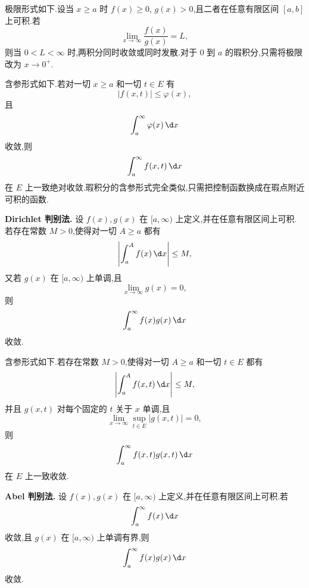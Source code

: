 极限形式如下.设当 $x\geq a$ 时 $f(x)\geq0$, $g(x)>0$,且二者在任意有限区间 $[a,b]$ 上可积.若
\begin{equation*}
	\lim_{x\to\infty}\frac{f(x)}{g(x)}=L,
\end{equation*}
则当 $0<L<\infty$ 时,两积分同时收敛或同时发散.对于 $0$ 到 $a$ 的瑕积分,只需将极限改为 $x\to0^+$.

含参形式如下.若对一切 $x\geq a$ 和一切 $t\in E$ 有
\begin{equation*}
	|f(x,t)|\leq \varphi(x),
\end{equation*}
且
\begin{equation*}
	\int_a^\infty \varphi(x)\,\d x
\end{equation*}
收敛,则
\begin{equation*}
	\int_a^\infty f(x,t)\,\d x
\end{equation*}
在 $E$ 上一致绝对收敛.瑕积分的含参形式完全类似,只需把控制函数换成在瑕点附近可积的函数.

\textbf{Dirichlet 判别法.}
设 $f(x),g(x)$ 在 $[a,\infty)$ 上定义,并在任意有限区间上可积.若存在常数 $M>0$,使得对一切 $A\geq a$ 都有
\begin{equation*}
	\left|\int_a^A f(x)\,\d x\right|\leq M,
\end{equation*}
又若 $g(x)$ 在 $[a,\infty)$ 上单调,且
\begin{equation*}
	\lim_{x\to\infty}g(x)=0,
\end{equation*}
则
\begin{equation*}
	\int_a^\infty f(x)g(x)\,\d x
\end{equation*}
收敛.

含参形式如下.若存在常数 $M>0$,使得对一切 $A\geq a$ 和一切 $t\in E$ 都有
\begin{equation*}
	\left|\int_a^A f(x,t)\,\d x\right|\leq M,
\end{equation*}
并且 $g(x,t)$ 对每个固定的 $t$ 关于 $x$ 单调,且
\begin{equation*}
	\lim_{x\to\infty}\sup_{t\in E}|g(x,t)|=0,
\end{equation*}
则
\begin{equation*}
	\int_a^\infty f(x,t)g(x,t)\,\d x
\end{equation*}
在 $E$ 上一致收敛.

\textbf{Abel 判别法.}
设 $f(x),g(x)$ 在 $[a,\infty)$ 上定义,并在任意有限区间上可积.若
\begin{equation*}
	\int_a^\infty f(x)\,\d x
\end{equation*}
收敛,且 $g(x)$ 在 $[a,\infty)$ 上单调有界,则
\begin{equation*}
	\int_a^\infty f(x)g(x)\,\d x
\end{equation*}
收敛.

